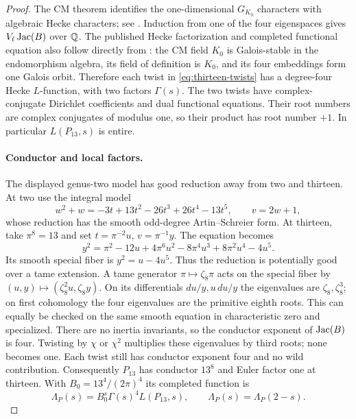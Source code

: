 \begin{proof}
The CM theorem identifies the one-dimensional $G_{K_0}$ characters
with algebraic Hecke characters; see
\citet[Theorems~3.5 and 3.7, pp.~10--11]{ConradCM}.
Induction from one of the four eigenspaces gives
$V_\ell\operatorname{Jac}(B)$ over $\mathbb Q$. The published Hecke factorization
and completed functional equation also follow directly from
\citet[Theorem~4 and Remark~2, pp.~187--188]{Milne1972}:
the CM field $K_0$ is Galois-stable in the endomorphism algebra,
its field of definition is $K_0$, and its four embeddings form
one Galois orbit. Therefore each twist in
\eqref{eq:thirteen-twists} has a degree-four Hecke $L$-function,
with two factors $\Gamma(s)$. The two twists have complex-conjugate
Dirichlet coefficients and dual functional equations. Their root
numbers are complex conjugates of modulus one, so their product
has root number $+1$. In particular $L(P_{13},s)$ is entire.

\paragraph{Conductor and local factors.}
The displayed genus-two model has good reduction away from two
and thirteen. At two use the integral model
\[
 w^2+w=-3t+13t^2-26t^3+26t^4-13t^5,
 \qquad v=2w+1,
\]
whose reduction has the smooth odd-degree Artin--Schreier form.
At thirteen, take $\pi^8=13$ and set $t=\pi^{-2}u$,
$v=\pi^{-1}y$. The equation becomes
\[
 y^2=\pi^2-12u+4\pi^6u^2-8\pi^4u^3+8\pi^2u^4-4u^5.
\]
Its smooth special fiber is $y^2=u-4u^5$. Thus the reduction is
potentially good over a tame extension. A tame generator
$\pi\mapsto\zeta_8\pi$ acts on the special fiber by
$(u,y)\mapsto(\zeta_8^2u,\zeta_8y)$.
On its differentials $du/y,u\,du/y$ the eigenvalues are
$\zeta_8,\zeta_8^3$; on first cohomology the four eigenvalues are
the primitive eighth roots. This can equally be checked on the
same smooth equation in characteristic zero and specialized.
There are no inertia invariants, so the conductor exponent of
$\operatorname{Jac}(B)$ is four. Twisting by $\chi$ or $\chi^2$ multiplies
these eigenvalues by third roots; none becomes one. Each twist
still has conductor exponent four and no wild contribution.
Consequently $P_{13}$ has conductor $13^8$ and Euler factor one
at thirteen. With $B_0=13^4/(2\pi)^4$ its completed function is
\[
 \Lambda_P(s)=B_0^s\Gamma(s)^4L(P_{13},s),\qquad
 \Lambda_P(s)=\Lambda_P(2-s).
\]


\end{proof}
